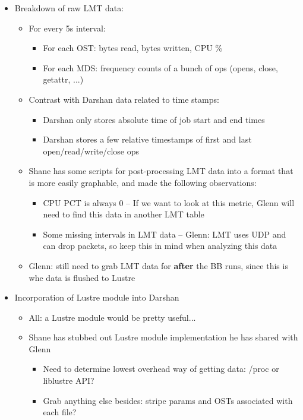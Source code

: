 \documentclass[conference,10pt,compsocconf]{IEEEtran}
\begin{document}
\begin{itemize}
\item Breakdown of raw LMT data:
    \begin{itemize}
    \item For every 5s interval:
        \begin{itemize}
        \item For each OST: bytes read, bytes written, CPU \%
        \item For each MDS: frequency counts of a bunch of ops (opens, close, getattr, ...)
        \end{itemize}
    \item Contrast with Darshan data related to time stamps:
        \begin{itemize}
        \item Darshan only stores absolute time of job start and end times
        \item Darshan stores a few relative timestamps of first and last open/read/write/close ops
        \end{itemize}
    \item Shane has some scripts for post-processing LMT data into a format that is more easily
          graphable, and made the following observations:
        \begin{itemize}
        \item CPU PCT is always 0 -- If we want to look at this metric, Glenn will need to find this
              data in another LMT table
        \item Some missing intervals in LMT data -- Glenn: LMT uses UDP and can drop packets, so
              keep this in mind when analyzing this data
        \end{itemize}
    \item Glenn: still need to grab LMT data for \textbf{after} the BB runs, since this is whe data
          is flushed to Lustre
    \end{itemize}
\item Incorporation of Lustre module into Darshan
    \begin{itemize}
    \item All: a Lustre module would be pretty useful...
    \item Shane has stubbed out Lustre module implementation he has shared with Glenn
        \begin{itemize}
        \item Need to determine lowest overhead way of getting data: /proc or liblustre API?
        \item Grab anything else besides: stripe params and OSTs associated with each file?

\end{itemize}
\end{itemize}
\end{itemize}
\end{document}
